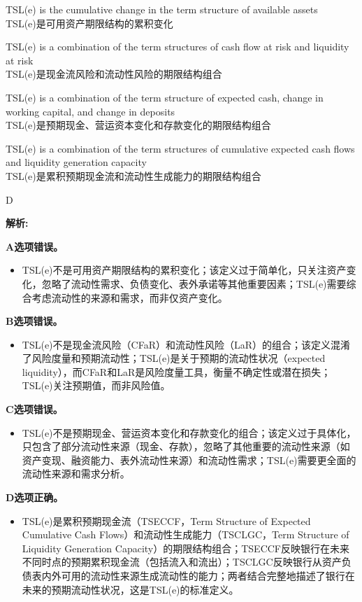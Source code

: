 \documentclass{article}
\newenvironment{explanation}
{\textbf{解析:}\par}
{\par}
\begin{document}
\begin{choices}
    \item TSL(e) is the cumulative change in the term structure of available assets\\
    TSL(e)是可用资产期限结构的累积变化
    \item TSL(e) is a combination of the term structures of cash flow at risk and liquidity at risk\\
    TSL(e)是现金流风险和流动性风险的期限结构组合
    \item TSL(e) is a combination of the term structure of expected cash, change in working capital, and change in deposits\\
    TSL(e)是预期现金、营运资本变化和存款变化的期限结构组合
    \item TSL(e) is a combination of the term structures of cumulative expected cash flows and liquidity generation capacity\\
    TSL(e)是累积预期现金流和流动性生成能力的期限结构组合
\end{choices}

\begin{correctanswer}
    D
\end{correctanswer}

\begin{explanation}
    \textbf{A选项错误。}
    \begin{itemize}
        \item TSL(e)不是可用资产期限结构的累积变化；该定义过于简单化，只关注资产变化，忽略了流动性需求、负债变化、表外承诺等其他重要因素；TSL(e)需要综合考虑流动性的来源和需求，而非仅资产变化。
    \end{itemize}

    \textbf{B选项错误。}
    \begin{itemize}
        \item TSL(e)不是现金流风险（CFaR）和流动性风险（LaR）的组合；该定义混淆了风险度量和预期流动性；TSL(e)是关于预期的流动性状况（expected liquidity），而CFaR和LaR是风险度量工具，衡量不确定性或潜在损失；TSL(e)关注预期值，而非风险值。
    \end{itemize}

    \textbf{C选项错误。}
    \begin{itemize}
        \item TSL(e)不是预期现金、营运资本变化和存款变化的组合；该定义过于具体化，只包含了部分流动性来源（现金、存款），忽略了其他重要的流动性来源（如资产变现、融资能力、表外流动性来源）和流动性需求；TSL(e)需要更全面的流动性来源和需求分析。
    \end{itemize}

    \textbf{D选项正确。}
    \begin{itemize}
        \item TSL(e)是累积预期现金流（TSECCF，Term Structure of Expected Cumulative Cash Flows）和流动性生成能力（TSCLGC，Term Structure of Liquidity Generation Capacity）的期限结构组合；TSECCF反映银行在未来不同时点的预期累积现金流（包括流入和流出）；TSCLGC反映银行从资产负债表内外可用的流动性来源生成流动性的能力；两者结合完整地描述了银行在未来的预期流动性状况，这是TSL(e)的标准定义。
    \end{itemize}
\end{explanation}
\end{document}
